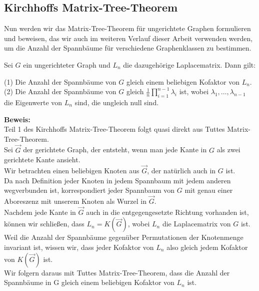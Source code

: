 \subsection{Kirchhoffs Matrix-Tree-Theorem}
Nun werden wir das Matrix-Tree-Theorem für ungerichtete Graphen formulieren und beweisen, das wir auch im weiteren Verlauf dieser Arbeit verwenden werden, um die Anzahl der Spannbäume für verschiedene Graphenklassen zu bestimmen.
\begin{Tms}
Sei $G$ ein ungerichteter Graph und $L_n$  die dazugehörige Laplacematrix. 
Dann gilt:
\par
\begingroup
\leftskip=20pt%
\rightskip=20pt
\noindent %
(1) Die Anzahl der Spannbäume von $G$ gleich einem beliebigen Kofaktor von $L_n$.\\
(2) Die Anzahl der Spannbäume von $G$ gleich $\frac{1}{n}\prod_{i=1}^{n-1}\lambda_i$ ist, wobei $\lambda_1,\ldots,\lambda_{n-1}$ die Eigenwerte von $L_n$ sind, die ungleich null sind.
\par
\endgroup
\end{Tms}
\textbf{Beweis:}\\
Teil 1 des Kirchhoffs Matrix-Tree-Theorem folgt quasi direkt aus Tuttes Matrix-Tree-Theorem. \\
Sei $\vec{G}$ der gerichtete Graph, der entsteht, wenn man jede Kante in $G$ als zwei gerichtete Kante ansieht.\\
Wir betrachten einen beliebigen Knoten aus $\vec{G}$, der natürlich auch in $G$ ist. \\
Da nach Definition jeder Knoten in jedem Spannbaum mit jedem anderen wegverbunden ist, korrespondiert jeder Spannbaum von $G$ mit genau einer Aboreszenz mit unserem Knoten als Wurzel in $\vec{G}$. \\
Nachdem jede Kante in $\vec{G}$ auch in die entgegengesetzte Richtung vorhanden ist, können wir schließen, dass $L_n=K(\vec{G})$, wobei $L_n$ die Laplacematrix von $G$ ist. \\
Weil die Anzahl der Spannbäume gegenüber Permutationen der Knotenmenge invariant ist, wissen wir, dass jeder Kofaktor von $L_n$ also gleich jedem Kofaktor von $K(\vec{G})$ ist.\\
Wir folgern daraus mit Tuttes Matrix-Tree-Theorem, dass die Anzahl der Spannbäume in G gleich einem beliebigen Kofaktor von $L_n$ ist.\\ \\
